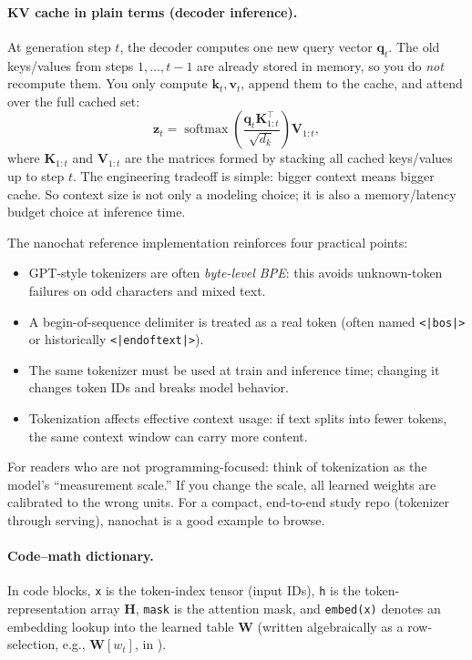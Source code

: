 \paragraph{KV cache in plain terms (decoder inference).}
At generation step \(t\), the decoder computes one new query vector \(\mathbf{q}_t\). The old keys/values from steps \(1,\dots,t-1\) are already stored in memory, so you do \emph{not} recompute them. You only compute \(\mathbf{k}_t,\mathbf{v}_t\), append them to the cache, and attend over the full cached set:
\begin{equation}
\mathbf{z}_t
= \operatorname{softmax}\!\left(\frac{\mathbf{q}_t \mathbf{K}_{1:t}^{\top}}{\sqrt{d_k}}\right)\mathbf{V}_{1:t},
\label{eq:transformers_kv_cache_decode_step}
\end{equation}
where \(\mathbf{K}_{1:t}\) and \(\mathbf{V}_{1:t}\) are the matrices formed by stacking all cached keys/values up to step \(t\). The engineering tradeoff is simple: bigger context means bigger cache. So context size is not only a modeling choice; it is also a memory/latency budget choice at inference time.

\begin{tcolorbox}[summarybox, title={Tokenization note from a GPT-2-style implementation}]
The nanochat reference implementation reinforces four practical points:
\begin{itemize}
    \item GPT-style tokenizers are often \emph{byte-level BPE}: this avoids unknown-token failures on odd characters and mixed text.
    \item A begin-of-sequence delimiter is treated as a real token (often named \texttt{<|bos|>} or historically \texttt{<|endoftext|>}).
    \item The same tokenizer must be used at train and inference time; changing it changes token IDs and breaks model behavior.
    \item Tokenization affects effective context usage: if text splits into fewer tokens, the same context window can carry more content.
\end{itemize}
For readers who are not programming-focused: think of tokenization as the model's ``measurement scale.'' If you change the scale, all learned weights are calibrated to the wrong units. For a compact, end-to-end study repo (tokenizer through serving), nanochat is a good example to browse. \citep{KarpathyNanochat}
\end{tcolorbox}
\paragraph{Code--math dictionary.} In code blocks, \texttt{x} is the token-index tensor (input IDs), \texttt{h} is the token-representation array \(\mathbf{H}\), \texttt{mask} is the attention mask, and \texttt{embed(x)} denotes an embedding lookup into the learned table \(\mathbf{W}\) (written algebraically as a row-selection, e.g., \(\mathbf{W}[w_t]\), in ).

